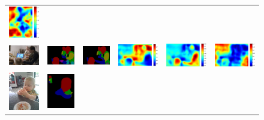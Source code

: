 \documentclass[10pt,twocolumn,letterpaper]{article}
\begin{document}
\begin{figure}
\begin{tabular}{c c c c c c}
   \includegraphics[height=0.13\linewidth]{fig/voc10_part/att3/2008_000691.pdf} \\
   \includegraphics[height=0.09\linewidth]{fig/voc10_part/img/2008_002789.jpg} &
   \includegraphics[height=0.09\linewidth]{fig/voc10_part/res_baseline/2008_002789.png} &
   \includegraphics[height=0.09\linewidth]{fig/voc10_part/res_sharenet/2008_002789.png} &
   \includegraphics[height=0.09\linewidth]{fig/voc10_part/att1/2008_002789.pdf} &
   \includegraphics[height=0.09\linewidth]{fig/voc10_part/att2/2008_002789.pdf} &
   \includegraphics[height=0.09\linewidth]{fig/voc10_part/att3/2008_002789.pdf} \\
   \includegraphics[height=0.13\linewidth]{fig/voc10_part/img/2008_003136.jpg} &
   \includegraphics[height=0.13\linewidth]{fig/voc10_part/res_baseline/2008_003136.png} &

\end{tabular}
\end{figure}
\end{document}
